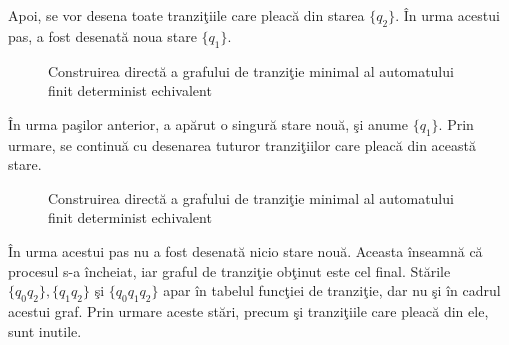 Apoi, se vor desena toate tranziţiile care pleacă din starea $\{q_2\}$. În urma acestui pas, a fost desenată noua stare $\{q_1\}$.

\begin{figure}[H]
\centering
{}
\caption{Construirea directă a grafului de tranziţie minimal al automatului finit determinist echivalent}
\end{figure}

În urma paşilor anterior, a apărut o singură stare nouă, şi anume $\{q_1\}$. Prin urmare, se continuă cu desenarea tuturor tranziţiilor care pleacă din această stare.

\begin{figure}[H]
\centering
{}
\caption{Construirea directă a grafului de tranziţie minimal al automatului finit determinist echivalent}
\end{figure}

În urma acestui pas nu a fost desenată nicio stare nouă. Aceasta înseamnă că procesul s-a încheiat, iar graful de tranziţie obţinut este cel final. Stările $ \{q_0 q_2\}, \{q_1 q_2\} $ şi $ \{ q_0 q_1 q_2 \} $ apar în tabelul funcţiei de tranziţie, dar nu şi în cadrul acestui graf. Prin urmare aceste stări, precum şi tranziţiile care pleacă din ele, sunt inutile.

